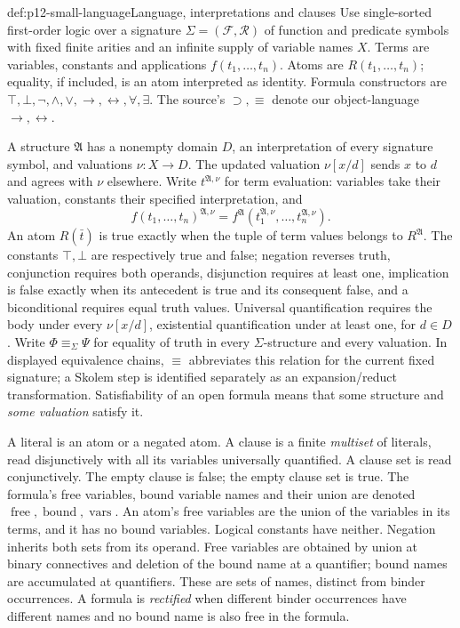 \begin{hbdefinition}{def:p12-small-language}{Language, interpretations and clauses}
Use single-sorted first-order logic over a signature
\(\Sigma=(\mathcal F,\mathcal R)\) of function and predicate symbols
with fixed finite arities and an infinite supply of variable names \(X\).
Terms are variables, constants and applications \(f(t_1,\ldots,t_n)\).
Atoms are \(R(t_1,\ldots,t_n)\); equality, if included, is an atom
interpreted as identity. Formula constructors are
\(\top,\bot,\neg,\land,\lor,\to,\leftrightarrow,\forall,\exists\).
The source's \(\supset,\equiv\) denote our object-language
\(\to,\leftrightarrow\).

A structure \(\mathfrak A\) has a nonempty domain \(D\), an
interpretation of every signature symbol, and valuations \(\nu:X\to D\).
The updated valuation \(\nu[x/d]\) sends \(x\) to \(d\) and
agrees with \(\nu\) elsewhere. Write \(t^{\mathfrak A,\nu}\)
for term evaluation: variables take their valuation, constants their
specified interpretation, and
\[
 f(t_1,\ldots,t_n)^{\mathfrak A,\nu}
 =f^{\mathfrak A}(t_1^{\mathfrak A,\nu},\ldots,t_n^{\mathfrak A,\nu}).
\]
An atom \(R(\bar t)\) is true exactly when the tuple of term values
belongs to \(R^{\mathfrak A}\). The constants \(\top,\bot\)
are respectively true and false; negation reverses truth, conjunction
requires both operands, disjunction requires at least one, implication
is false exactly when its antecedent is true and its consequent false,
and a biconditional requires equal truth values. Universal quantification
requires the body under every \(\nu[x/d]\), existential quantification
under at least one, for \(d\in D\).
Write \(\Phi\equiv_\Sigma\Psi\)
for equality of truth in every \(\Sigma\)-structure and every valuation.
In displayed equivalence chains, \(\equiv\) abbreviates this relation
for the current fixed signature; a Skolem step is identified separately
as an expansion/reduct transformation.
Satisfiability of an open formula means that some structure and
\emph{some valuation} satisfy it.

A literal is an atom or a negated atom. A clause is a finite
\emph{multiset} of literals, read disjunctively with all its variables
universally quantified. A clause set is read conjunctively.
The empty clause is false; the empty clause set is true.
The formula's free variables, bound variable names and their union
are denoted \(\operatorname{free},\operatorname{bound},\operatorname{vars}\).
An atom's free variables are the union of the variables in its terms,
and it has no bound variables. Logical constants have neither.
Negation inherits both sets from its operand.
Free variables are obtained by union at binary connectives and deletion
of the bound name at a quantifier; bound names are accumulated at
quantifiers. These are sets of names, distinct from binder occurrences.
A formula is \emph{rectified} when different binder occurrences have
different names and no bound name is also free in the formula.
\end{hbdefinition}

